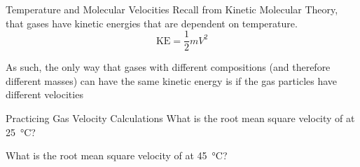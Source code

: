 \documentclass[notes=hide]{beamer}
\begin{document}
\clearpage

\begin{frame}{Temperature and Molecular Velocities}
	Recall from Kinetic Molecular Theory, that gases have \alert{kinetic
	energies} that are dependent on temperature.
	\begin{equation*}
		\text{KE} = \frac{1}{2} mV^2
	\end{equation*}

	\pause

	As such, the \alert{only} way that gases with different compositions (and
	therefore different masses) can have the same kinetic energy is if the
	gas particles have different \alert{velocities}
	\begin{center}
\end{center}
\end{frame}


\begin{frame}[t]{Practicing Gas Velocity Calculations}
	What is the root mean square velocity of  at \SI{25}{\celsius}?

\end{frame}

\begin{onyourown}
	What is the root mean square velocity of  at \SI{45}{\celsius}?
\end{onyourown}
\end{document}
